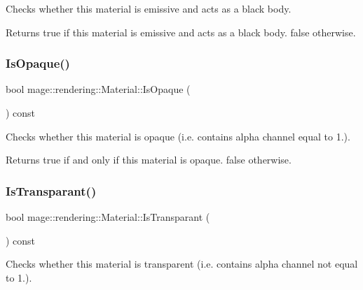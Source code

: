 Checks whether this material is emissive and acts as a black body.

\begin{DoxyReturn}{Returns}
{\ttfamily true} if this material is emissive and acts as a black body. {\ttfamily false} otherwise. 
\end{DoxyReturn}
\mbox{\label{classmage_1_1rendering_1_1_material_af750917e67bdaf7e47129617102887ab}} 
\subsubsection{\texorpdfstring{Is\+Opaque()}{IsOpaque()}}
{\footnotesize\ttfamily bool mage\+::rendering\+::\+Material\+::\+Is\+Opaque (\begin{DoxyParamCaption}{ }\end{DoxyParamCaption}) const\hspace{0.3cm}{\ttfamily [noexcept]}}

Checks whether this material is opaque (i.\+e. contains alpha channel equal to 1.).

\begin{DoxyReturn}{Returns}
{\ttfamily true} if and only if this material is opaque. {\ttfamily false} otherwise. 
\end{DoxyReturn}
\mbox{\label{classmage_1_1rendering_1_1_material_ae60d1b61ebd38d3e329a519b2f2c3dad}} 
\subsubsection{\texorpdfstring{Is\+Transparant()}{IsTransparant()}}
{\footnotesize\ttfamily bool mage\+::rendering\+::\+Material\+::\+Is\+Transparant (\begin{DoxyParamCaption}{ }\end{DoxyParamCaption}) const\hspace{0.3cm}{\ttfamily [noexcept]}}

Checks whether this material is transparent (i.\+e. contains alpha channel not equal to 1.).

